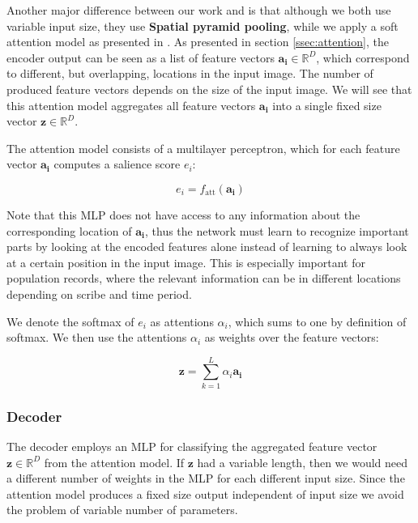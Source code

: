Another major difference between our work and \cite{FornesCnnCategorization} is that although we both use variable input size, they use \textbf{Spatial pyramid pooling}, while we apply a soft attention model as presented in \cite{AttendAndTell}. As presented in section \ref{ssec:attention}, the encoder output can be seen as a list of feature vectors $\mathbf{a_i} \in \mathbb{R}^D$, which correspond to different, but overlapping, locations in the input image. The number of produced feature vectors depends on the size of the input image. We will see that this attention model aggregates all feature vectors $\mathbf{a_i}$ into a single fixed size vector $\mathbf{z} \in \mathbb{R}^D$.

The attention model consists of a multilayer perceptron, which for each feature vector $\mathbf{a_i}$ computes a salience score $e_i$:

\[
e_i = f_\text{att}(\mathbf{a_i})
\]

Note that this MLP does not have access to any information about the corresponding location of $\mathbf{a_i}$, thus the network must learn to recognize important parts by looking at the encoded features alone instead of learning to always look at a certain position in the input image. This is especially important for population records, where the relevant information can be in different locations depending on scribe and time period.


We denote the softmax of $e_i$ as attentions $\alpha_i$, which sums to one by definition of softmax.
We then use the attentions $\alpha_i$ as weights over the feature vectors:

\[
\mathbf{z} = \sum_{k=1}^L \alpha_i \mathbf{a_i}
\]



\subsubsection{Decoder}

The decoder employs an MLP for classifying the aggregated feature vector $\mathbf{z} \in \mathbb{R}^D$ from the attention model.
If $\mathbf{z}$ had a variable length, then we would need a different number of weights in the MLP for each different input size. Since the attention model produces a fixed size output independent of input size we avoid the problem of variable number of parameters.

